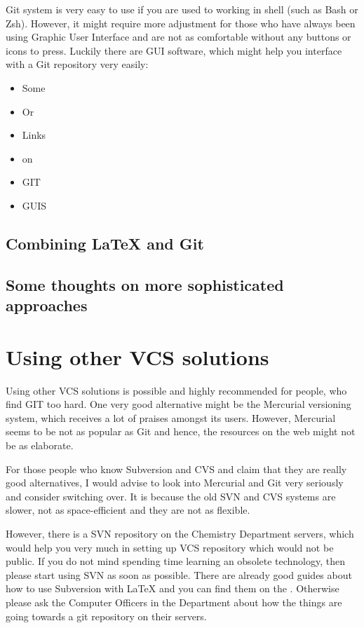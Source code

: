 Git system is very easy to use if you are used to working in shell (such as Bash
or Zsh).
%
However, it might require more adjustment for those who have always been using
Graphic User Interface and are not as comfortable without any buttons or icons
to press.
%
Luckily there are GUI software, which might help you interface with a Git
repository very easily:
\begin{itemize}
    \item Some
    \item Or
    \item Links
    \item on
    \item GIT
    \item GUIS
\end{itemize}

\subsection{Combining \LaTeX{} and Git}

\subsection{Some thoughts on more sophisticated approaches}

\section{Using other VCS solutions}

Using other VCS solutions is possible and highly recommended for people, who
find GIT too hard. 
%
One very good alternative might be the Mercurial versioning system, which
receives a lot of praises amongst its users.
%
However, Mercurial seems to be not as popular as Git and hence, the resources on
the web might not be as elaborate.

For those people who know Subversion and CVS and claim that they are really good
alternatives, I would advise to look into Mercurial and Git very seriously and
consider switching over.
%
It is because the old SVN and CVS systems are slower, not as space-efficient and
they are not as flexible.

However, there is a SVN repository on the Chemistry Department servers, which
would help you very much in setting up VCS repository which would not be public.
%
If you do not mind spending time learning an obsolete technology, then please
start using SVN as soon as possible.
%
There are already good guides about how to use Subversion with \LaTeX{} and you
can find them on the
.
%
Otherwise please ask the Computer Officers in the Department about how the
things are going towards a git repository on their servers.





